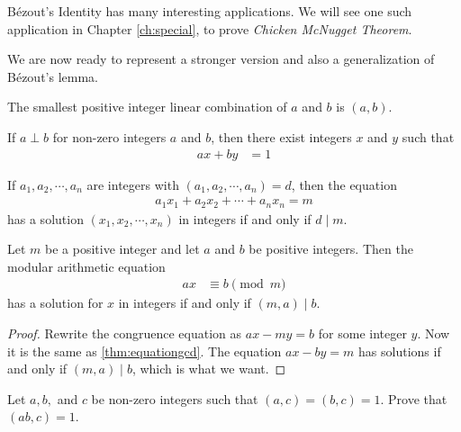 \documentclass{subfile}
\begin{document}
	B\'{e}zout's Identity has many interesting applications. We will see one such application in Chapter \ref{ch:special}, to prove \textit{Chicken McNugget Theorem}.

	We are now ready to represent a stronger version and also a generalization of B\'{e}zout's lemma.

	\begin{corollary}   \label{cor:strongbezout}
		The smallest positive integer linear combination of $a$ and $b$ is $(a,b)$.
	\end{corollary}

	\begin{corollary}  \label{cor:bezoutrelatively prime}
		If $a \perp b$ for non-zero integers $a$ and $b$, then there exist integers $x$ and $y$ such that
			\begin{align*}
				ax+by
					& = 1
			\end{align*}
	\end{corollary}

	\begin{theorem} 
		If $a_1, a_2, \cdots, a_n$ are integers with $(a_1, a_2, \cdots, a_n)=d$, then the equation
			\begin{align*}
				a_1x_1 + a_2x_2 + \cdots + a_n x_n = m
			\end{align*}
		has a solution $(x_1, x_2, \cdots, x_n)$ in integers if and only if $d\mid m$.
	\end{theorem}

	\begin{theorem}\label{thm:ax=b}
		Let $m$ be a positive integer and let $a$ and $b$ be positive integers. Then the modular arithmetic equation
		\begin{align*}
			ax
				& \equiv b \pmod m
		\end{align*}
		has a solution for $x$ in integers if and only if $(m,a)\mid b$.
	\end{theorem}

	\begin{proof}
		Rewrite the congruence equation as $ax-my = b$ for some integer $y$. Now it is the same as \autoref{thm:equationgcd}. The equation $ax-by=m$ has solutions if and only if $(m,a)\mid b$, which is what we want.
	\end{proof}

	\begin{problem}
		Let $a,b,$ and $c$ be non-zero integers such that $(a, c)=(b,c)=1$. Prove that $(ab,c)=1$.
	\end{problem}
\end{document}
